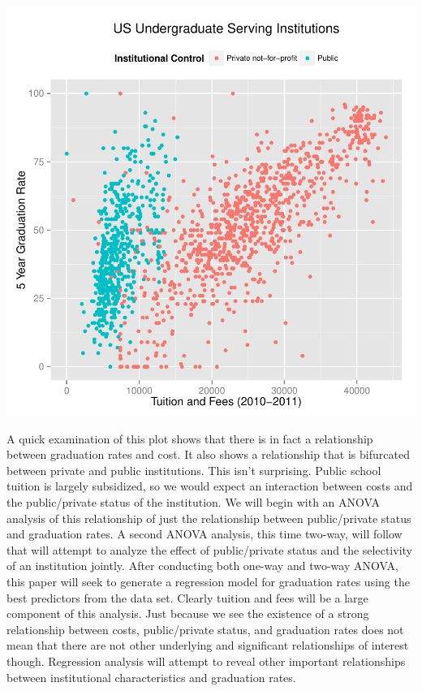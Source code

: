 \documentclass{article}
\begin{document}
\includegraphics{Fig-sourceanalysis1}

A quick examination of this plot shows that there is in fact a relationship between graduation rates and cost. It also shows a relationship that is bifurcated between private and public institutions. This isn't surprising. Public school tuition is largely subsidized, so we would expect an interaction between costs and the public/private status of the institution. We will begin with an ANOVA analysis of this relationship of just the relationship between public/private status and graduation rates. A second ANOVA analysis, this time two-way, will follow that will attempt to analyze the effect of public/private status and the selectivity of an institution jointly. After conducting both one-way and two-way ANOVA, this paper will seek to generate a regression model for graduation rates using the best predictors from the data set. Clearly tuition and fees will be a large component of this analysis. Just because we see the existence of a strong relationship between costs, public/private status, and graduation rates does not mean that there are not other underlying and significant relationships of interest though. Regression analysis will attempt to reveal other important relationships between institutional characteristics and graduation rates.

\FloatBarrier
\end{document}
